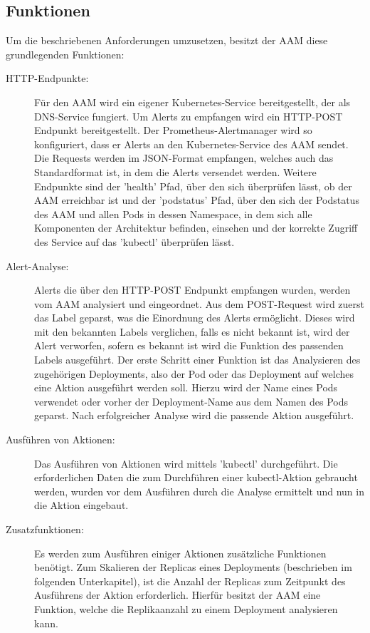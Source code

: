 \documentclass[a4paper,10pt]{scrartcl}
\begin{document}
\subsection{Funktionen}

Um die beschriebenen Anforderungen umzusetzen, besitzt der AAM diese grundlegenden Funktionen:\\

\begin{description}

\item[HTTP-Endpunkte:]
Für den AAM wird ein eigener Kubernetes-Service bereitgestellt, der als DNS-Service fungiert.
Um Alerts zu empfangen wird ein HTTP-POST Endpunkt bereitgestellt. Der Prometheus-Alertmanager wird so konfiguriert, dass er Alerts an den Kubernetes-Service des AAM sendet. Die Requests werden im JSON-Format empfangen, welches auch das Standardformat ist, in dem die Alerts versendet werden.
Weitere Endpunkte sind der 'health' Pfad, über den sich überprüfen lässt, ob der AAM erreichbar ist und der 'podstatus' Pfad, über den sich der Podstatus des AAM und allen Pods in dessen Namespace, in dem sich alle Komponenten der Architektur befinden, einsehen und der korrekte Zugriff des Service auf das 'kubectl' überprüfen lässt.
\item[Alert-Analyse:]
Alerts die über den HTTP-POST Endpunkt empfangen wurden, werden vom AAM analysiert und eingeordnet. Aus dem POST-Request wird zuerst das Label geparst, was die Einordnung des Alerts ermöglicht. Dieses wird mit den bekannten Labels verglichen, falls es nicht bekannt ist, wird der Alert verworfen, sofern es bekannt ist wird die Funktion des passenden Labels ausgeführt. Der erste Schritt einer Funktion ist das Analysieren des zugehörigen Deployments, also der Pod oder das Deployment auf welches eine Aktion ausgeführt werden soll. Hierzu wird der Name eines Pods verwendet oder vorher der Deployment-Name aus dem Namen des Pods geparst.
Nach erfolgreicher Analyse wird die passende Aktion ausgeführt.
\item[Ausführen von Aktionen:]
Das Ausführen von Aktionen wird mittels 'kubectl' durchgeführt. Die erforderlichen Daten die zum Durchführen einer kubectl-Aktion gebraucht werden, wurden vor dem Ausführen durch die Analyse ermittelt und nun in die Aktion eingebaut.
\item[Zusatzfunktionen:]
Es werden zum Ausführen einiger Aktionen zusätzliche Funktionen benötigt. Zum Skalieren der Replicas eines Deployments (beschrieben im folgenden Unterkapitel), ist die Anzahl der Replicas zum Zeitpunkt des Ausführens der Aktion erforderlich. Hierfür besitzt der AAM eine Funktion, welche die Replikaanzahl zu einem Deployment analysieren kann.

\end{description}
\end{document}
